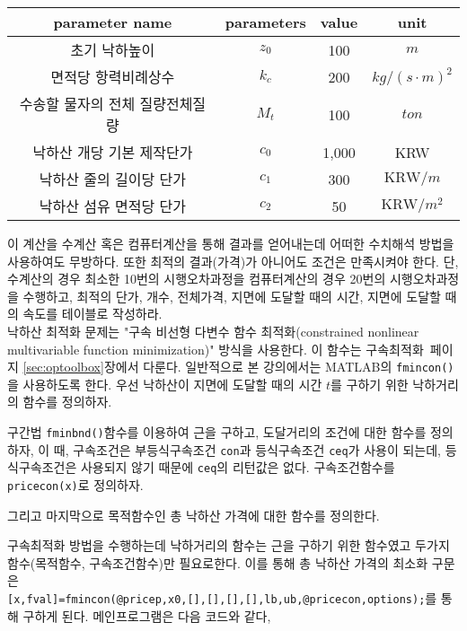 \begin{table}[!hbt]
\centering
\begin{tabular}{c|c|c|c}
\hline\hline
parameter name&parameters&value&unit\\
\hline
초기 낙하높이&$z_{0}$&100&$m$\\
면적당 항력비례상수&$k_{c}$&200&$kg/(s\cdot m)^2$\\
수송할 물자의 전체 질량전체질량&$M_{t}$&100&$ton$\\
낙하산 개당 기본 제작단가&$c_{0}$&1,000&KRW\\
낙하산 줄의 길이당 단가&$c_{1}$&300&$\text{KRW}/m$\\
낙하산 섬유 면적당 단가&$c_{2}$&50&$\text{KRW}/m^2$\\
\hline\hline
\end{tabular}
\end{table}
이 계산을 수계산 혹은 컴퓨터계산을 통해 결과를 얻어내는데 어떠한 수치해석 방법을 사용하여도 무방하다. 또한 최적의 결과(가격)가 아니어도 조건은 만족시켜야 한다.
단, 수계산의 경우 최소한 10번의 시행오차과정을 컴퓨터계산의 경우 20번의 시행오차과정을 수행하고, 최적의 단가, 개수, 전체가격, 지면에 도달할 때의 시간, 지면에 도달할 때의 속도를 테이블로 작성하라.\\
 낙하산 최적화 문제는 "구속 비선형 다변수 함수 최적화(constrained nonlinear multivariable function minimization)" 방식을 사용한다. 이 함수는 구속최적화~\pageref{sec:optoolbox}페이지 \ref{sec:optoolbox}장에서 다룬다. 일반적으로 본 강의에서는 MATLAB의 \texttt{fmincon()}을 사용하도록 한다. 우선 낙하산이 지면에 도달할 때의 시간 $t$를 구하기 위한 낙하거리의 함수를 정의하자.
 
구간법 \texttt{fminbnd()}함수를 이용하여 근을 구하고, 도달거리의 조건에 대한 함수를 정의하자, 이 때, 구속조건은 부등식구속조건 \texttt{con}과 등식구속조건 \texttt{ceq}가 사용이 되는데, 등식구속조건은 사용되지 않기 때문에 \texttt{ceq}의 리턴값은 없다. 구속조건함수를 \texttt{pricecon(x)}로 정의하자.
 
그리고 마지막으로 목적함수인 총 낙하산 가격에 대한 함수를 정의한다.

구속최적화 방법을 수행하는데 낙하거리의 함수는 근을 구하기 위한 함수였고 두가지함수(목적함수, 구속조건함수)만 필요로한다. 이를 통해 총 낙하산 가격의 최소화 구문은\\ \texttt{[x,fval]=fmincon(@pricep,x0,[],[],[],[],lb,ub,@pricecon,options);}를 통해 구하게 된다. 메인프로그램은 다음 코드와 같다,
